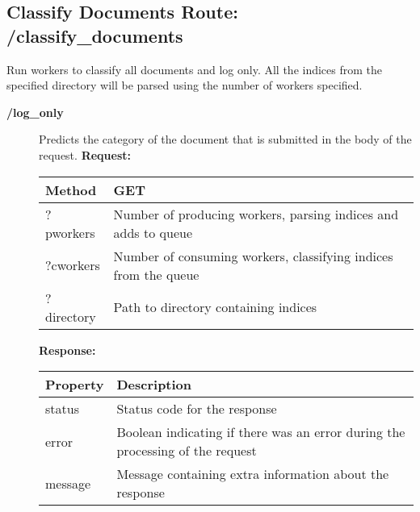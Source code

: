 \subsection{Classify Documents Route: /classify\_documents}
Run workers to classify all documents and log only.
All the indices from the specified directory will be parsed using the number of workers specified.

\begin{description}

\item[{\large \textbf{/log\_only}}]
Predicts the category of the document that is submitted in the body of the request.
\newline
\newline
\textbf{Request:}
\newline
\newline
\begin{tabular}{ | l | l |}
\hline
Method & GET\\ \hline
?pworkers & Number of producing workers, parsing indices and adds to queue\\ \hline
?cworkers & Number of consuming workers, classifying indices from the queue\\ \hline
?directory & Path to directory containing indices\\ \hline
\end{tabular}
\newline
\newline
\textbf{Response:}
\newline
\newline
\begin{tabular}{ | l | l |}
\hline
\textbf{Property} & \textbf{Description}\\ \hline
status & Status code for the response\\ \hline
error & Boolean indicating if there was an error during the processing of the request\\ \hline
message & Message containing extra information about the response\\ \hline
\end{tabular}\\


\end{description}
